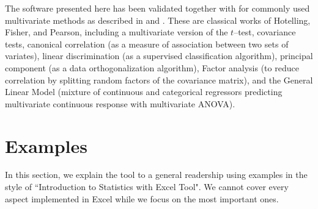 \documentclass[article]{jss}
\begin{document}
  
        The software presented here has been validated together with  for commonly used multivariate methods as described in \cite{anderson2003introMVA3e} and \cite{johnson1992applied}. These are classical works of Hotelling, Fisher, and Pearson, including a multivariate version of the  $t$--test, covariance tests, canonical correlation (as a measure of association between two sets of variates), linear discrimination (as a supervised classification algorithm),  principal component (as a data orthogonalization algorithm), Factor analysis (to reduce correlation by splitting random factors of the covariance matrix), and the General Linear Model (mixture of continuous and categorical regressors predicting multivariate continuous response with multivariate ANOVA).
  
  
        \section[example]{Examples}
        
        
            In this section, we explain the tool to a general readership using examples in the style of ``Introduction to Statistics with Excel Tool". We cannot cover every aspect implemented in Excel while we focus on the most important ones.
        
        
\end{document}
